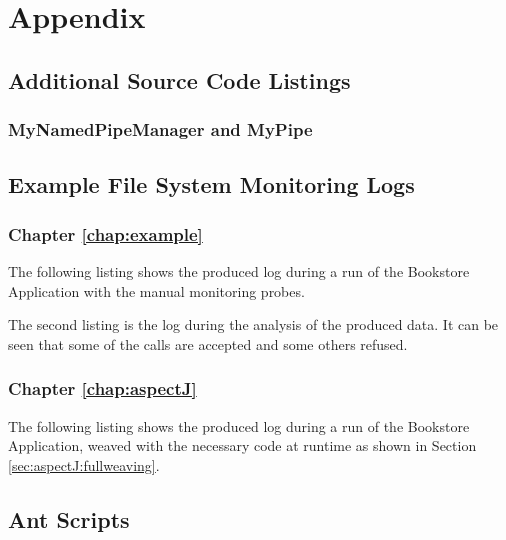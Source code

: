 % 


\appendix
\chapter{Appendix}

  \section{Additional Source Code Listings}
    \subsection{MyNamedPipeManager and MyPipe}
      \setJavaCodeListing
      

      \setJavaCodeListing
      

\newpage
  \section{Example File System Monitoring Logs}

	\subsection{Chapter \ref{chap:example}}
		The following listing shows the produced log during a run of the Bookstore Application with the manual monitoring probes.
		
		The second listing is the log during the analysis of the produced data. It can be seen that some of the calls are accepted and some others refused.
		
	
	\subsection{Chapter \ref{chap:aspectJ}}
	    The following listing shows the produced log during a run of the Bookstore Application, weaved with the necessary code at runtime as shown in Section \ref{sec:aspectJ:fullweaving}.
		
	
\newpage
  \section{Ant Scripts}
